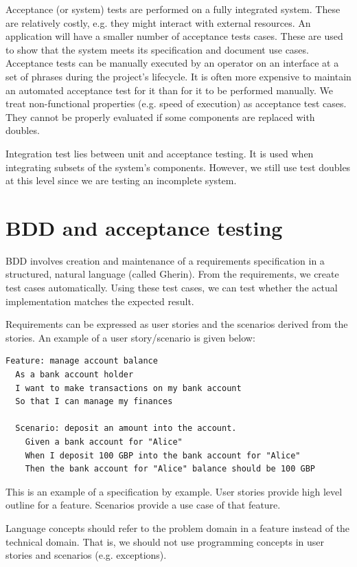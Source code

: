 \documentclass[a4paper, openany]{memoir}
\begin{document}
Acceptance (or system) tests are performed on a fully integrated system. These are relatively costly, e.g. they might interact with external resources. An application will have a smaller number of acceptance tests cases. These are used to show that the system meets its specification and document use cases. Acceptance tests can be manually executed by an operator on an interface at a set of phrases during the project's lifecycle. It is often more expensive to maintain an automated acceptance test for it than for it to be performed manually. We treat non-functional properties (e.g. speed of execution) as acceptance test cases. They cannot be properly evaluated if some components are replaced with doubles.

Integration test lies between unit and acceptance testing. It is used when integrating subsets of the system's components. However, we still use test doubles at this level since we are testing an incomplete system.

\section{BDD and acceptance testing}
BDD involves creation and maintenance of a requirements specification in a structured, natural language (called Gherin). From the requirements, we create test cases automatically. Using these test cases, we can test whether the actual implementation matches the expected result.

Requirements can be expressed as user stories and the scenarios derived from the stories. An example of a user story/scenario is given below:
\begin{verbatim}
Feature: manage account balance
  As a bank account holder
  I want to make transactions on my bank account
  So that I can manage my finances

  Scenario: deposit an amount into the account.
    Given a bank account for "Alice"
    When I deposit 100 GBP into the bank account for "Alice"
    Then the bank account for "Alice" balance should be 100 GBP
\end{verbatim}
\noindent This is an example of a specification by example. User stories provide high level outline for a feature. Scenarios provide a use case of that feature. 

Language concepts should refer to the problem domain in a feature instead of the technical domain. That is, we should not use programming concepts in user stories and scenarios (e.g. exceptions).
\end{document}
